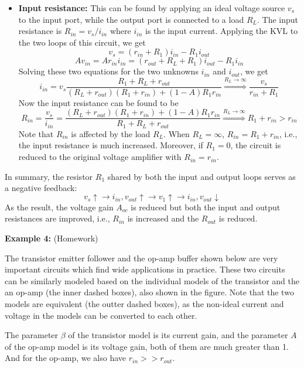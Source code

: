 \begin{itemize}
\begin{itemize}
\item {\bf Input resistance:} This can be found by applying an ideal voltage
  source $v_s$ to the input port, while the output port is connected to a 
  load $R_L$. The input resistance is $R_{in}=v_s/i_{in}$ where $i_{in}$ is
  the input current. Applying the KVL to the two loops of this circuit, we
  get
  \[ v_s=(r_{in}+R_1) i_{in}-R_1 i_{out} \]
  \[ A v_{in}=Ar_{in}i_{in}=(r_{out}+R_L+R_1)i_{out}-R_1i_{in} \]
  Solving these two equations for the two unknowns $i_{in}$ and $i_{out}$,
  we get
  \[ i_{in}=v_s \frac{R_1+R_L+r_{out}}{(R_L+r_{out})(R_1+r_{in})+(1-A)R_1r_{in}}
  \stackrel{R_L\rightarrow \infty}{\Longrightarrow} \frac{v_s}{r_{in}+R_1} \]
  Now the input resistance can be found to be
  \[ R_{in}=\frac{v_s}{i_{in}}=\frac{(R_L+r_{out})(R_1+r_{in})+(1-A)R_1r_{in}}{R_1+R_L+r_{out}}
  \stackrel{R_L\rightarrow \infty}{\Longrightarrow} R_1+r_{in}>r_{in} \]  
  Note that $R_{in}$ is affected by the load $R_L$. When $R_L=\infty$,
  $R_{in}=R_1+r_{in}$, i.e., the input resistance is much increased. 
  Moreover, if $R_1=0$, the circuit is reduced to the original voltage 
  amplifier with $R_{in}=r_{in}$.
\end{itemize}
In summary, the resistor $R_1$ shared by both the input and output loops
serves as a negative feedback:
\[ v_s\uparrow \rightarrow i_{in}, v_{out}\uparrow \rightarrow v_1\uparrow 
\rightarrow i_{in}, v_{out}\downarrow \]
As the result, the voltage gain $A_{oc}$ is reduced but both the input and
output resistances are improved, i.e., $R_{in}$ is increased and the $R_{out}$
is reduced.

{\bf Example 4:} (Homework)

The transistor emitter follower and the op-amp buffer shown below 
are very important circuits which find wide applications in 
practice. These two circuits can be similarly modeled based on the 
individual models of the transistor and the an op-amp (the inner
dashed boxes), also shown in the figure. Note that the two models 
are equivalent (the outter dashed boxes), as the non-ideal current 
and voltage in the models can be converted to each other.


The parameter $\beta$ of the transistor model is its current gain,
and the parameter $A$ of the op-amp model is its voltage gain, both
of them are much greater than 1. And for the op-amp, we also have
$r_{in}>>r_{out}$.


\end{itemize}
